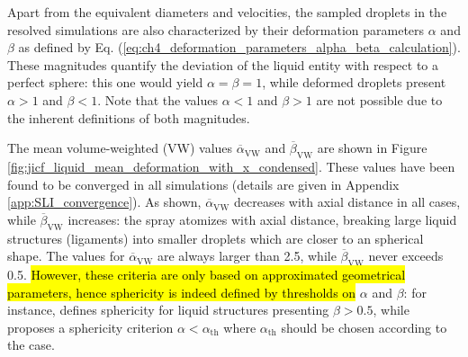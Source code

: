 Apart from the equivalent diameters and velocities, the sampled droplets in the resolved simulations are also characterized by their deformation parameters $\alpha$ and $\beta$ as defined by Eq. (\ref{eq:ch4_deformation_parameters_alpha_beta_calculation}). These magnitudes quantify the deviation of the liquid entity with respect to a perfect sphere: this one would yield $\alpha = \beta = 1$, while deformed droplets present $\alpha > 1$ and $\beta < 1$. Note that the values $\alpha < 1$ and $\beta > 1$ are not possible due to the inherent definitions of both magnitudes.


The mean volume-weighted (VW) values $\overline{\alpha}_\mathrm{VW}$ and $\overline{\beta}_\mathrm{VW}$
are shown in Figure \ref{fig:jicf_liquid_mean_deformation_with_x_condensed}. These values have been found to be converged in all simulations (details are given in Appendix \ref{app:SLI_convergence}). As shown, $\overline{\alpha}_\mathrm{VW}$ decreases with axial distance in all cases, while $\overline{\beta}_\mathrm{VW}$ increases: the spray atomizes with axial distance, breaking large liquid structures (ligaments) into smaller droplets which are closer to an spherical shape. The values for $\overline{\alpha}_\mathrm{VW}$ are always larger than 2.5, while $\overline{\beta}_\mathrm{VW}$ never exceeds 0.5. \hl{However, these criteria are only based on approximated geometrical parameters, hence sphericity is indeed defined by thresholds on} $\alpha$ and $\beta$: for instance,  defines sphericity for liquid structures presenting $\beta > 0.5$, while  proposes a sphericity criterion $\alpha < \alpha_\mathrm{th}$ where $\alpha_\mathrm{th}$ should be chosen according to the case. 


